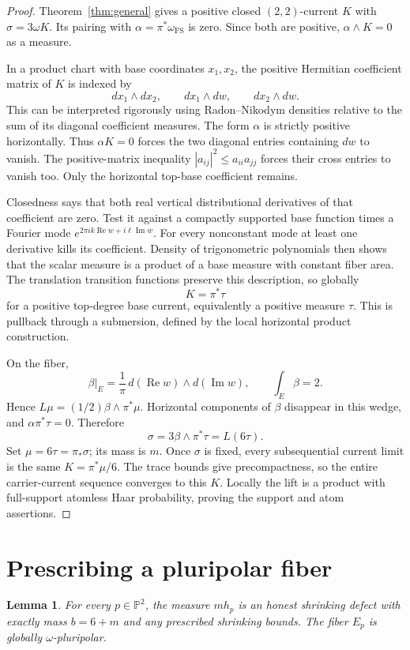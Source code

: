 \documentclass[11pt]{article}
\newtheorem{lemma}{Lemma}
\begin{document}
\begin{proof}
Theorem~\ref{thm:general} gives a positive closed $(2,2)$-current
$K$ with $\sigma=3\omega K$. Its pairing with
$\alpha=\pi^*\omega_{\mathrm{FS}}$ is zero. Since both are positive,
$\alpha\wedge K=0$ as a measure.

In a product chart with base coordinates $x_1,x_2$, the positive
Hermitian coefficient matrix of $K$ is indexed by
\[
 dx_1\wedge dx_2,\qquad dx_1\wedge dw,\qquad dx_2\wedge dw.
\]
This can be interpreted rigorously using Radon--Nikodym densities
relative to the sum of its diagonal coefficient measures.
The form $\alpha$ is strictly positive horizontally. Thus
$\alpha K=0$ forces the two diagonal entries containing $dw$ to
vanish. The positive-matrix inequality
$|a_{ij}|^2\leq a_{ii}a_{jj}$ forces their cross entries to vanish too.
Only the horizontal top-base coefficient remains.

Closedness says that both real vertical distributional derivatives
of that coefficient are zero. Test it against a compactly supported
base function times a Fourier mode
$e^{2\pi ik\operatorname{Re}w+i\ell\operatorname{Im}w}$.
For every nonconstant mode at least one derivative kills its
coefficient. Density of trigonometric polynomials then shows that
the scalar measure is a product of a base measure with constant
fiber area. The translation transition functions preserve this
description, so globally
\[
 K=\pi^*\tau
\]
for a positive top-degree base current, equivalently a positive
measure $\tau$. This is pullback through a submersion, defined by
the local horizontal product construction.

On the fiber,
\[
 \beta|_E=\frac1\pi\,d(\operatorname{Re}w)
                      \wedge d(\operatorname{Im}w),
 \qquad \int_E\beta=2.
\]
Hence $L\mu=(1/2)\beta\wedge\pi^*\mu$. Horizontal components of
$\beta$ disappear in this wedge, and $\alpha\pi^*\tau=0$.
Therefore
\[
 \sigma=3\beta\wedge\pi^*\tau=L(6\tau).
\]
Set $\mu=6\tau=\pi_*\sigma$; its mass is $m$.
Once $\sigma$ is fixed, every subsequential current limit is the
same $K=\pi^*\mu/6$. The trace bounds give precompactness, so the
entire carrier-current sequence converges to this $K$.
Locally the lift is a product with full-support atomless Haar
probability, proving the support and atom assertions.
\end{proof}

\section{Prescribing a pluripolar fiber}
\begin{lemma}\label{lem:fiber}
For every $p\in\mathbb P^2$, the measure $mh_p$ is an honest
shrinking defect with exactly mass $b=6+m$ and any prescribed
shrinking bounds. The fiber $E_p$ is globally $\omega$-pluripolar.
\end{lemma}
\end{document}
